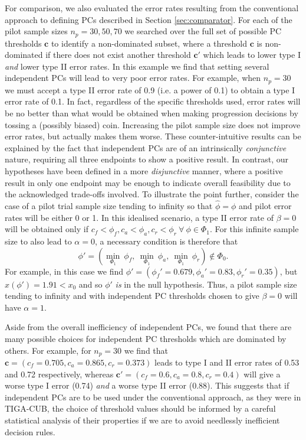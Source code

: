 \documentclass[AMA,STIX1COL]{WileyNJD-v2}
\begin{document}
For comparison, we also evaluated the error rates resulting from the conventional approach to defining PCs described in Section \ref{sec:comparator}. For each of the pilot sample sizes $n_p = 30, 50, 70$ we searched over the full set of possible PC thresholds $\mathbf{c}$ to identify a non-dominated subset, where a threshold $\mathbf{c}$ is non-dominated if there does not exist another threshold $\mathbf{c}'$ which leads to lower type I \emph{and} lower type II error rates. In this example we find that setting several independent PCs will lead to very poor error rates. For example, when $n_p = 30$  we must accept a type II error rate of 0.9 (i.e. a power of 0.1) to obtain a type I error rate of 0.1. In fact, regardless of the specific thresholds used, error rates will be no better than what would be obtained when making progression decisions by tossing a (possibly biased) coin. Increasing the pilot sample size does not improve error rates, but actually makes them worse. These counter-intuitive results can be explained by the fact that independent PCs are of an intrinsically \emph{conjunctive} nature, requiring all three endpoints to show a positive result. In contrast, our hypotheses have been defined in a more \emph{disjunctive} manner, where a positive result in only one endpoint may be enough to indicate overall feasibility due to the acknowledged trade-offs involved. To illustrate the point further, consider the case of a  pilot trial sample size tending to infinity so that $\hat{\phi} = \phi$ and pilot error rates will be either 0 or 1. In this idealised scenario, a type II error rate of $\beta = 0$ will be obtained only if $c_f < \phi_f, c_a < \phi_a, c_r < \phi_r ~ \forall ~ \phi \in \Phi_1$. For this infinite sample size to also lead to $\alpha = 0$, a necessary condition is therefore that
$$
\phi' = \left( \min_{\Phi_1} ~ \phi_f, ~ \min_{\Phi_1} ~ \phi_a, ~ \min_{\Phi_1} ~ \phi_r \right) \not\in \Phi_0.
$$ 
For example, in this case we find $\phi' = (\phi_f'=0.679, \phi_a'=0.83, \phi_r'=0.35)$, but $x(\phi') = 1.91 < x_0$ and so $\phi'$ \emph{is} in the null hypothesis. Thus, a pilot sample size tending to infinity and with independent PC thresholds chosen to give $\beta = 0$ will have $\alpha = 1$.

Aside from the overall inefficiency of independent PCs, we found that there are many possible choices for independent PC thresholds which are dominated by others. For example, for $n_p = 30$ we find that $\mathbf{c} = (c_f=0.705, c_a=0.865, c_r=0.373)$ leads to type I and II error rates of 0.53 and 0.72 respectively, whereas $\mathbf{c}' = (c_f=0.6, c_a=0.8, c_r=0.4)$ will give a worse type I error (0.74) \emph{and} a worse type II error (0.88). This suggests that if independent PCs are to be used under the conventional approach, as they were in TIGA-CUB, the choice of threshold values should be informed by a careful statistical analysis of their properties if we are to avoid needlessly inefficient decision rules. 
\end{document}
